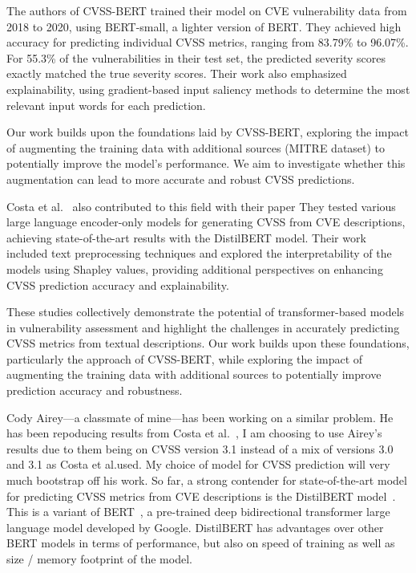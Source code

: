 \documentclass[12pt]{article}
\begin{document}
The authors of CVSS-BERT trained their model on CVE vulnerability data from 2018 to 2020, using
BERT-small, a lighter version of BERT. They achieved high accuracy for predicting individual CVSS
metrics, ranging from 83.79\% to 96.07\%. For 55.3\% of the vulnerabilities in their test set, the
predicted severity scores exactly matched the true severity scores. Their work also emphasized
explainability, using gradient-based input saliency methods to determine the most relevant input
words for each prediction.

Our work builds upon the foundations laid by CVSS-BERT, exploring the impact of augmenting the
training data with additional sources (MITRE dataset) to potentially improve the model's
performance. We aim to investigate whether this augmentation can lead to more accurate and robust
CVSS predictions.

Costa et al.~\cite{costa} also contributed to this field with their paper  They tested various large language encoder-only models for
generating CVSS from CVE descriptions, achieving state-of-the-art results with the DistilBERT model.
Their work included text preprocessing techniques and explored the interpretability of the models
using Shapley values, providing additional perspectives on enhancing CVSS prediction accuracy and
explainability.

These studies collectively demonstrate the potential of transformer-based models in vulnerability
assessment and highlight the challenges in accurately predicting CVSS metrics from textual
descriptions. Our work builds upon these foundations, particularly
the approach of CVSS-BERT, while exploring the impact of augmenting the training data with
additional sources to potentially improve prediction accuracy and robustness.

Cody Airey---a classmate of mine---has been working on a similar problem. He has been repoducing
results from Costa et al.\@~\cite{costa}, I am choosing to use Airey's results due to them being on
CVSS version 3.1 instead of a mix of versions 3.0 and 3.1 as Costa et al.\@ used. My choice of model
for CVSS prediction will very much bootstrap off his work. So far, a strong contender for
state-of-the-art model for predicting CVSS metrics from CVE descriptions is the DistilBERT
model~\cite{distilbert}. This is a variant of BERT~\cite{BERT}, a pre-trained deep bidirectional
transformer large language model developed by Google. DistilBERT has advantages over other BERT
models in terms of performance, but also on speed of training as well as size / memory footprint of
the model.
\end{document}
